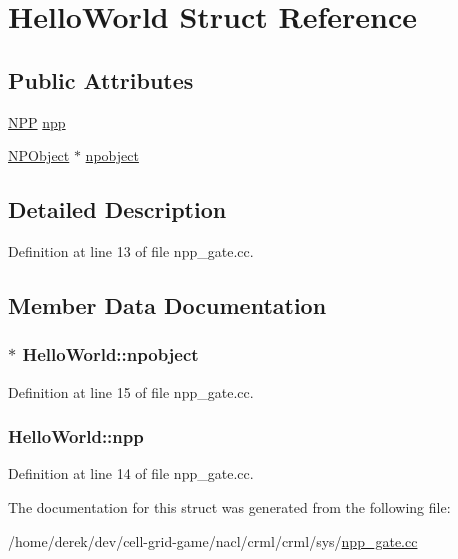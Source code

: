 \hypertarget{struct_hello_world}{
\section{HelloWorld Struct Reference}
\label{struct_hello_world}
}
\subsection*{Public Attributes}
\begin{DoxyCompactItemize}
\item 
\hyperlink{struct___n_p_p}{NPP} \hyperlink{struct_hello_world_a8546fa606713a22cd373527986469eba}{npp}
\item 
\hyperlink{struct_n_p_object}{NPObject} $\ast$ \hyperlink{struct_hello_world_ab53916603277423408f4e4997b3b5733}{npobject}
\end{DoxyCompactItemize}


\subsection{Detailed Description}


Definition at line 13 of file npp\_\-gate.cc.



\subsection{Member Data Documentation}
\hypertarget{struct_hello_world_ab53916603277423408f4e4997b3b5733}{
\subsubsection[{npobject}]{$\ast$ {\bf HelloWorld::npobject}}}
\label{struct_hello_world_ab53916603277423408f4e4997b3b5733}


Definition at line 15 of file npp\_\-gate.cc.

\hypertarget{struct_hello_world_a8546fa606713a22cd373527986469eba}{
\subsubsection[{npp}]{ {\bf HelloWorld::npp}}}
\label{struct_hello_world_a8546fa606713a22cd373527986469eba}


Definition at line 14 of file npp\_\-gate.cc.



The documentation for this struct was generated from the following file:\begin{DoxyCompactItemize}
\item 
/home/derek/dev/cell-\/grid-\/game/nacl/crml/crml/sys/\hyperlink{sys_2npp__gate_8cc}{npp\_\-gate.cc}\end{DoxyCompactItemize}
